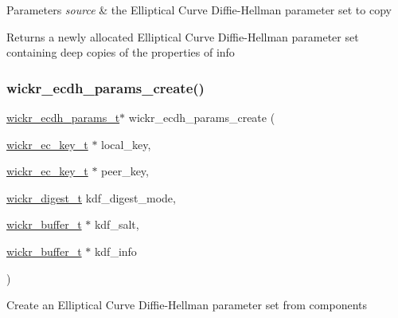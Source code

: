 \begin{DoxyParams}{Parameters}
{\em source} & the Elliptical Curve Diffie-\/\+Hellman parameter set to copy \\
\hline
\end{DoxyParams}
\begin{DoxyReturn}{Returns}
a newly allocated Elliptical Curve Diffie-\/\+Hellman parameter set containing deep copies of the properties of \textquotesingle{}info\textquotesingle{} 
\end{DoxyReturn}
\mbox{\label{group__wickr__ecdh__params_ga57bb855c4155488cf41d6c9e0d1f373d}} 
\subsubsection{\texorpdfstring{wickr\+\_\+ecdh\+\_\+params\+\_\+create()}{wickr\_ecdh\_params\_create()}}
{\footnotesize\ttfamily \hyperlink{structwickr__ecdh__params}{wickr\+\_\+ecdh\+\_\+params\+\_\+t}$\ast$ wickr\+\_\+ecdh\+\_\+params\+\_\+create (\begin{DoxyParamCaption}\item[{\hyperlink{structwickr__ec__key}{wickr\+\_\+ec\+\_\+key\+\_\+t} $\ast$}]{local\+\_\+key,  }\item[{\hyperlink{structwickr__ec__key}{wickr\+\_\+ec\+\_\+key\+\_\+t} $\ast$}]{peer\+\_\+key,  }\item[{\hyperlink{structwickr__digest}{wickr\+\_\+digest\+\_\+t}}]{kdf\+\_\+digest\+\_\+mode,  }\item[{\hyperlink{structwickr__buffer}{wickr\+\_\+buffer\+\_\+t} $\ast$}]{kdf\+\_\+salt,  }\item[{\hyperlink{structwickr__buffer}{wickr\+\_\+buffer\+\_\+t} $\ast$}]{kdf\+\_\+info }\end{DoxyParamCaption})}

Create an Elliptical Curve Diffie-\/\+Hellman parameter set from components


